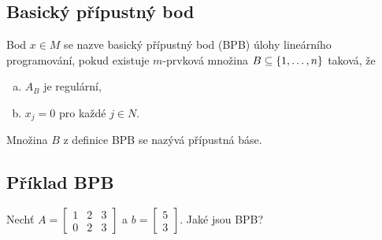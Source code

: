 \subsection{Basický přípustný bod}\label{BPB}
Bod $x \in M$ se nazve basický přípustný bod (BPB) úlohy lineárního programování, pokud existuje $m$-prvková množina
$B \subseteq \left\lbrace 1, \dots, n \right\rbrace$ taková, že
\begin{enumerate}[(a)]
    \item $A_B$ je regulární,
    \item $x_j = 0$ pro každé $j \in N$.
\end{enumerate}
Množina $B$ z definice BPB se nazývá přípustná báse.

\subsection{Příklad BPB}
Nechť
$A =
    \begin{bmatrix}
        1 & 2 & 3 \\
        0 & 2 & 3
    \end{bmatrix}
$ a $b =
    \begin{bmatrix}
        5 \\
        3
    \end{bmatrix}
$. Jaké jsou BPB?
